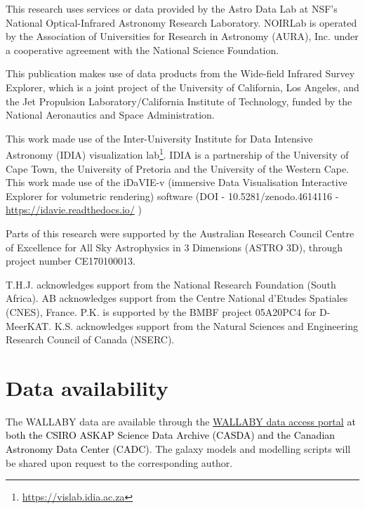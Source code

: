 \documentclass[fleqn,usenatbib]{mnras}
\begin{document}
This research uses services or data provided by the Astro Data Lab at NSF's National Optical-Infrared Astronomy Research Laboratory. NOIRLab is operated by the Association of Universities for Research in Astronomy (AURA), Inc. under a cooperative agreement with the National Science Foundation.

This publication makes use of data products from the Wide-field Infrared Survey Explorer, which is a joint project of the University of California, Los Angeles, and the Jet Propulsion Laboratory/California Institute of Technology, funded by the National Aeronautics and Space Administration.

This work made use of the Inter-University Institute for Data Intensive Astronomy (IDIA) visualization lab\footnote{\href{https://vislab.idia.ac.za}{https://vislab.idia.ac.za}}. IDIA is a partnership of the University of Cape Town, the University of Pretoria and the University of the Western Cape. This work made use of the iDaVIE-v (immersive Data Visualisation Interactive Explorer for volumetric rendering) software (DOI - 10.5281/zenodo.4614116 - \href{https://idavie.readthedocs.io/}{https://idavie.readthedocs.io/} ) 

Parts of this research were supported by the Australian Research Council Centre of Excellence for All Sky Astrophysics in 3 Dimensions (ASTRO 3D), through project number CE170100013.

T.H.J. acknowledges support from the National Research Foundation (South Africa). AB acknowledges support from the Centre National d'Etudes Spatiales (CNES), France.  P.K. is supported by the BMBF project 05A20PC4 for D-MeerKAT.  K.S. acknowledges support from the Natural Sciences and Engineering Research Council of Canada (NSERC).

\section*{Data availability}

The WALLABY data are available through the \href{https://wallaby-survey.org/}{WALLABY data access portal} \textcolor{black}{at both the CSIRO ASKAP Science Data Archive (CASDA) and the Canadian Astronomy Data Center (CADC)}.  The galaxy models and modelling scripts will be shared upon request to the corresponding author.


\end{document}
